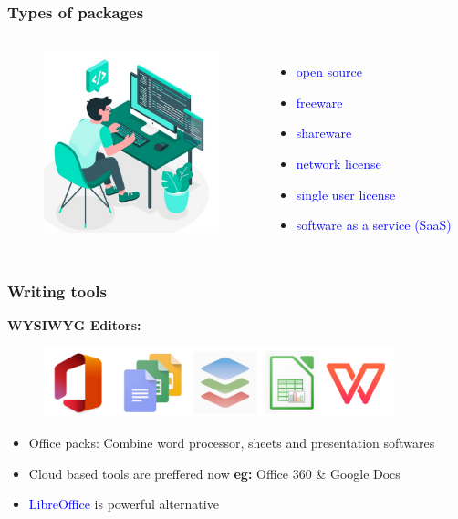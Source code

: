 \documentclass[newPxFont,sthlmFooter]{beamer}
\newcommand{\fs}{\footnotesize}
\begin{document}
\begin{frame}\frametitle{Types of packages}
  \begin{columns}[T,onlytextwidth]
  \begin{figure}
    \centering
    \includegraphics[width=2in]{figs/pkg} 
  \end{figure}
     \vspace{1cm}
\begin{itemize}
  \fs
  \item \textcolor{blue}{open source}
  \item \textcolor{blue}{freeware}
  \item \textcolor{blue}{shareware}
  \item \textcolor{blue}{network license}
  \item \textcolor{blue}{single user license}
  \item \textcolor{blue}{software as a service (SaaS)}
  \end{itemize}
  \end{columns}
\end{frame}

\begin{frame}\frametitle{Writing tools}
{\bf WYSIWYG Editors:}\\
\begin{figure}
    \centering
    \includegraphics[width=4in]{figs/wt} 
\end{figure}
\begin{itemize}
\fs
\item Office packs: Combine word processor, sheets and presentation softwares
\item Cloud based tools are preffered now {\bf eg:} Office 360 \& Google Docs
\item \textcolor{blue}{LibreOffice} is powerful alternative
\end{itemize}
\end{frame}
\end{document}
